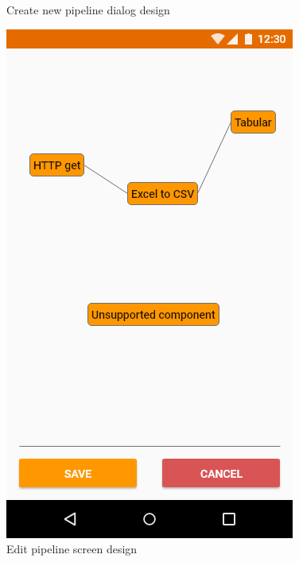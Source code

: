 \begin{figure}
\begin{minipage}[b]{0.32\textwidth}
    	\caption[Create new pipeline dialog]{Create new pipeline dialog design}\label{fig:xdCreateNewPipelineDialog}
    \end{minipage}
    \begin{minipage}[b]{0.32\textwidth}
    	\includegraphics[width=\textwidth]{pics/xd/Pipeline editor.png}
    	\caption[Edit pipeline screen]{Edit pipeline screen design}\label{fig:xdPipelineEditor}
    \end{minipage}
\end{figure}



